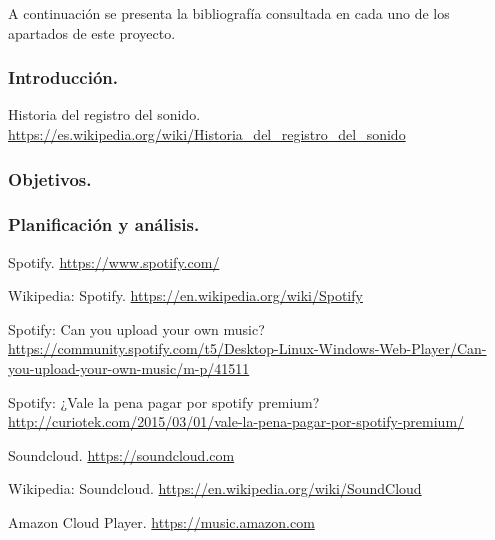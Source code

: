 \label{cap:bibliografia}

A continuación se presenta la bibliografía consultada en cada uno de los apartados de este proyecto.

\bigskip

\subsubsection*{Introducción.}

 Historia del registro del sonido. \url{https://es.wikipedia.org/wiki/Historia_del_registro_del_sonido}

\subsubsection*{Objetivos.}

\subsubsection*{Planificación y análisis.}

 Spotify. \url{https://www.spotify.com/}

 Wikipedia: Spotify. \url{https://en.wikipedia.org/wiki/Spotify}

 Spotify: Can you upload your own music? \url{https://community.spotify.com/t5/Desktop-Linux-Windows-Web-Player/Can-you-upload-your-own-music/m-p/41511}

 Spotify: ¿Vale la pena pagar por spotify premium? \url{http://curiotek.com/2015/03/01/vale-la-pena-pagar-por-spotify-premium/}

 Soundcloud. \url{https://soundcloud.com}

 Wikipedia: Soundcloud. \url{https://en.wikipedia.org/wiki/SoundCloud}

 Amazon Cloud Player. \url{https://music.amazon.com}

